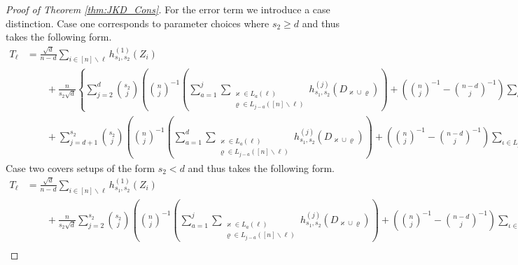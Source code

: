 \begin{proof}[Proof of Theorem \ref{thm:JKD_Cons}]
	\newpage
	For the error term we introduce a case distinction.
	Case one corresponds to parameter choices where $s_2 \geq d$ and thus takes the following form.
	\begin{equation}
		\begin{aligned}
			T_{\ell}
			 & = \frac{\sqrt{d}}{n - d}\sum_{i \in [n] \backslash \ell} h^{(1)}_{s_1, s_2}(Z_{i})             \\
			 & \quad \quad + \frac{n}{s_2\sqrt{d}} \left\{\sum_{j = 2}^{d}\binom{s_2}{j}\left(\binom{n}{j}^{-1}\left(
			\sum_{a = 1}^{j}\sum_{\substack{\varkappa \in L_{a}\left(\ell\right)                                       \\ \varrho \in L_{j - a}\left([n]\backslash \ell\right)}} h^{(j)}_{s_1, s_2}(D_{\varkappa \cup \varrho})\right)
			+ \left(\binom{n}{j}^{-1} - \binom{n-d}{j}^{-1}\right)
			\sum_{\iota \in L_{j}\left([n]\backslash \ell\right)} h^{(j)}_{s_1, s_2}(\mathbf{D}_{\iota})\right)\right. \\
			 & \quad \quad +\left.  \sum_{j = d + 1}^{s_2}\binom{s_2}{j}
			\left( \binom{n}{j}^{-1}\left(
			\sum_{a = 1}^{d}\sum_{\substack{\varkappa \in L_{a}\left(\ell\right)                                       \\ \varrho \in L_{j - a}\left([n]\backslash \ell\right)}} h^{(j)}_{s_1, s_2}(D_{\varkappa \cup \varrho})\right)
			+ \left(\binom{n}{j}^{-1} - \binom{n-d}{j}^{-1}\right)\sum_{\iota \in L_{j}\left([n]\backslash \ell\right)} h^{(j)}_{s_1, s_2}(\mathbf{D}_{\iota})\right)
			\right\}
		\end{aligned}
	\end{equation}
	Case two covers setups of the form $s_2 < d$ and thus takes the following form.
	\begin{equation}
		\begin{aligned}
			T_{\ell}
			 & = \frac{\sqrt{d}}{n - d}\sum_{i \in [n] \backslash \ell} h^{(1)}_{s_1, s_2}(Z_{i})         \\
			 & \quad \quad + \frac{n}{s_2 \sqrt{d}}  \sum_{j = 2}^{s_2}\binom{s_2}{j}\left(\binom{n}{j}^{-1}\left(
			\sum_{a = 1}^{j}\sum_{\substack{\varkappa \in L_{a}\left(\ell\right)                                   \\ \varrho \in L_{j - a}\left([n]\backslash \ell\right)}} h^{(j)}_{s_1, s_2}(D_{\varkappa \cup \varrho})\right)
			+ \left(\binom{n}{j}^{-1} - \binom{n-d}{j}^{-1}\right)
			\sum_{\iota \in L_{j}\left([n]\backslash \ell\right)} h^{(j)}_{s_1, s_2}(\mathbf{D}_{\iota})\right)    \\
		\end{aligned}
	\end{equation}


\end{proof}
